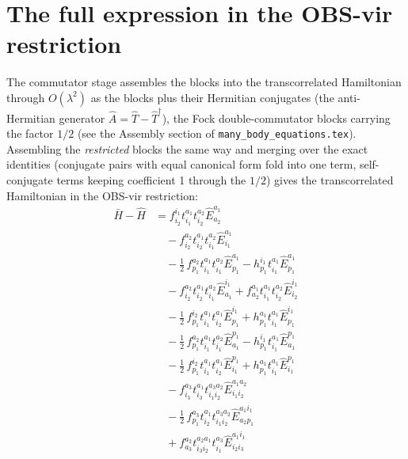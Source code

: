 \documentclass[11pt]{article}
\begin{document}
\section{The full expression in the OBS-vir restriction}
The commutator stage assembles the blocks into the transcorrelated Hamiltonian through $O(\lambda^2)$ as the blocks plus their Hermitian conjugates (the anti-Hermitian generator $\hat A = \hat T - \hat T^\dagger$), the Fock double-commutator blocks carrying the factor $1/2$ (see the Assembly section of \texttt{many\_body\_equations.tex}).  Assembling the \emph{restricted} blocks the same way and merging over the exact identities (conjugate pairs with equal canonical form fold into one term, self-conjugate terms keeping coefficient 1 through the $1/2$) gives the transcorrelated Hamiltonian in the OBS-vir restriction:
\begin{align}
\bar H - \hat H &= f^{i_{1}}_{i_{2}} t^{a_{1}}_{i_{1}} t^{a_{2}}_{i_{2}} \hat{E}^{a_{1}}_{a_{2}} \\
&\quad - f^{a_{2}}_{i_{2}} t^{a_{1}}_{i_{2}} t^{a_{2}}_{i_{1}} \hat{E}^{a_{1}}_{i_{1}} \\
&\quad - \tfrac{1}{2}\, f^{a_{2}}_{p_{1}} t^{a_{1}}_{i_{1}} t^{a_{2}}_{i_{1}} \hat{E}^{a_{1}}_{p_{1}} - h^{i_{1}}_{p_{1}} t^{a_{1}}_{i_{1}} \hat{E}^{a_{1}}_{p_{1}} \\
&\quad - f^{a_{2}}_{i_{2}} t^{a_{1}}_{i_{2}} t^{a_{2}}_{i_{1}} \hat{E}^{i_{1}}_{a_{1}} + f^{a_{1}}_{a_{2}} t^{a_{1}}_{i_{1}} t^{a_{2}}_{i_{2}} \hat{E}^{i_{1}}_{i_{2}} \\
&\quad - \tfrac{1}{2}\, f^{i_{2}}_{p_{1}} t^{a_{1}}_{i_{1}} t^{a_{1}}_{i_{2}} \hat{E}^{i_{1}}_{p_{1}} + h^{a_{1}}_{p_{1}} t^{a_{1}}_{i_{1}} \hat{E}^{i_{1}}_{p_{1}} \\
&\quad - \tfrac{1}{2}\, f^{a_{2}}_{p_{1}} t^{a_{1}}_{i_{1}} t^{a_{2}}_{i_{1}} \hat{E}^{p_{1}}_{a_{1}} - h^{i_{1}}_{p_{1}} t^{a_{1}}_{i_{1}} \hat{E}^{p_{1}}_{a_{1}} \\
&\quad - \tfrac{1}{2}\, f^{i_{2}}_{p_{1}} t^{a_{1}}_{i_{1}} t^{a_{1}}_{i_{2}} \hat{E}^{p_{1}}_{i_{1}} + h^{a_{1}}_{p_{1}} t^{a_{1}}_{i_{1}} \hat{E}^{p_{1}}_{i_{1}} \\
&\quad - f^{a_{3}}_{i_{3}} t^{a_{1}}_{i_{3}} t^{a_{3}a_{2}}_{i_{1}i_{2}} \hat{E}^{a_{1}a_{2}}_{i_{1}i_{2}} \\
&\quad - \tfrac{1}{2}\, f^{a_{3}}_{p_{1}} t^{a_{1}}_{i_{2}} t^{a_{3}a_{2}}_{i_{1}i_{2}} \hat{E}^{a_{1}i_{1}}_{a_{2}p_{1}} \\
&\quad + f^{a_{2}}_{a_{3}} t^{a_{2}a_{1}}_{i_{3}i_{2}} t^{a_{3}}_{i_{1}} \hat{E}^{a_{1}i_{1}}_{i_{2}i_{3}} \\

\end{align}
\end{document}
